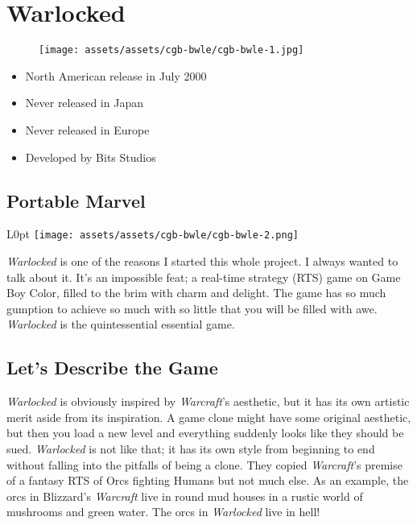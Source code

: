 \documentclass{book}
\begin{document}
\begingroup \chapter*{Warlocked} \endgroup
\begin{figure}[H]
\vskip 4pt
\centering
\texttt{[image: assets/assets/cgb-bwle/cgb-bwle-1.jpg]}\end{figure}
\begin{itemize} [nosep]




\item North American release in July 2000








\item Never released in Japan



\item Never released in Europe



\item Developed by Bits Studios

\end{itemize}\noindent

\newpage\FloatBarrier\needspace{10mm}\section*{Portable Marvel}\nopagebreak[4]
\begin{wrapfigure}{L}{0pt} \texttt{[image: assets/assets/cgb-bwle/cgb-bwle-2.png]}\end{wrapfigure}
\emph{Warlocked} is one of the reasons I started this whole project. I always wanted to talk about it. It’s an impossible feat; a real-time strategy (RTS) game on Game Boy Color, filled to the brim with charm and delight. The game has so much gumption to achieve so much with so little that you will be filled with awe. \emph{Warlocked} is the quintessential essential game.

\FloatBarrier\needspace{10mm}\section*{Let’s Describe the Game}\nopagebreak[4]

\emph{Warlocked} is obviously inspired by \emph{Warcraft}’s aesthetic, but it has its own artistic merit aside from its inspiration. A game clone might have some original aesthetic, but then you load a new level and everything suddenly looks like they should be sued. \emph{Warlocked} is not like that; it has its own style from beginning to end without falling into the pitfalls of being a clone. They copied \emph{Warcraft}’s premise of a fantasy RTS of Orcs fighting Humans but not much else. As an example, the orcs in Blizzard’s \emph{Warcraft} live in round mud houses in a rustic world of mushrooms and green water. The orcs in \emph{Warlocked} live in hell!
\end{document}
